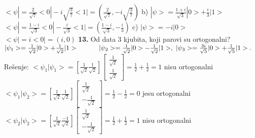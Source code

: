 \documentclass{article}
\begin{document}
\newline \hspace*{0.5cm}$<\psi| = \frac{2}{\sqrt{7}}<0| - i\sqrt{\frac{3}{7}}<1| = (\frac{2}{\sqrt{7}}, -i\sqrt{\frac{3}{7}})$
\vspace{0.2cm}\newline
b) $|\psi> = \frac{1+i}{\sqrt{3}}|0> + \frac{i}{3}|1>$
\newline \hspace*{0.5cm}$<\psi| = \frac{1-i}{\sqrt{3}}<0| - \frac{i}{\sqrt{3}}<1| = (\frac{1-i}{\sqrt{3}}, -\frac{i}{3})$
\vspace{0.2cm}\newline
c) $|\psi> =-i|0>$
\newline \hspace*{0.5cm}$<\psi| = i<0| = (i, 0)$
\vspace*{0.4cm}\newline
\textbf{13.} Od data 3 kjubita, koji parovi su ortogonalni? $|\psi_1> = \frac{1}{\sqrt{2}}|0> + \frac{1}{\sqrt{2}}|1> \newline \hspace*{1.1cm}|\psi_2> = \frac{1}{\sqrt{2}}|0> - \frac{1}{\sqrt{2}}|1>,\ |\psi_3> = \frac{3i}{\sqrt{5}}|0> + \frac{1}{\sqrt{5}}|1>.$
\vspace*{0.4cm}\newline
Rešenje: \newline
$<\psi_1|\psi_1> = [\frac{1}{\sqrt{2}} \frac{1}{\sqrt{2}}]\begin{bmatrix}
    \frac{1}{\sqrt{2}}\\
    \frac{1}{\sqrt{2}}
\end{bmatrix} = 
\frac{1}{2} + \frac{1}{2} = 1 $ nisu ortogonalni
\vspace{0.3cm}\newline
$<\psi_1|\psi_2> = [\frac{1}{\sqrt{2}} \frac{1}{\sqrt{2}}]\begin{bmatrix}
    \frac{1}{\sqrt{2}}\\
    -\frac{1}{\sqrt{2}}
\end{bmatrix} = 
\frac{1}{2} - \frac{1}{2} = 0 $ jesu ortogonalni
\vspace{0.3cm}\newline
$<\psi_2|\psi_2> = [\frac{1}{\sqrt{2}} \frac{-1}{\sqrt{2}}]\begin{bmatrix}
    \frac{1}{\sqrt{2}}\\
    -\frac{1}{\sqrt{2}}
\end{bmatrix} = 
\frac{1}{2} + \frac{1}{2} = 1 $ nisu ortogonalni
\vspace{0.3cm}\newline
\end{document}
